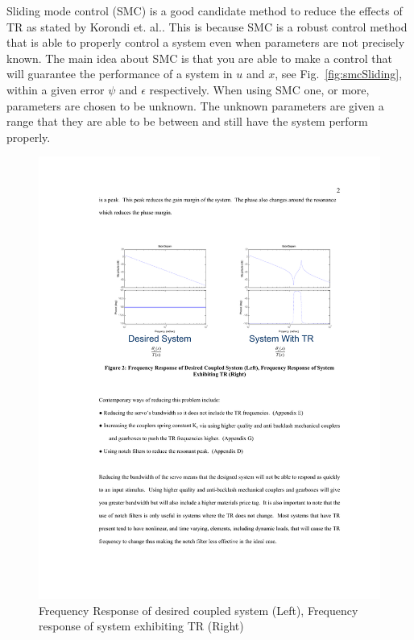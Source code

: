 Sliding mode control (SMC) is a good candidate method to reduce the effects of TR as stated by Korondi et. al.\cite{681228}. This is because SMC is a robust control method that is able to properly control a system even when parameters are not precisely known.   The main idea about SMC is that you are able to make a control that will guarantee the performance of a system in $u$ and $x$, see Fig.~\ref{fig:smcSliding}, within a given error $\psi$ and $\epsilon$ respectively. When using SMC one, or more, parameters are chosen to be unknown. The unknown parameters are given a range that they are able to be between and still have the system perform properly.

\begin{figure}[t]
  \centering
\includegraphics[width=1.0\columnwidth]{./pix/desBode.pdf}
  \caption{Frequency Response of desired coupled system (Left), Frequency response of system
exhibiting TR (Right)}
  \label{fig:desBode}
\end{figure}






